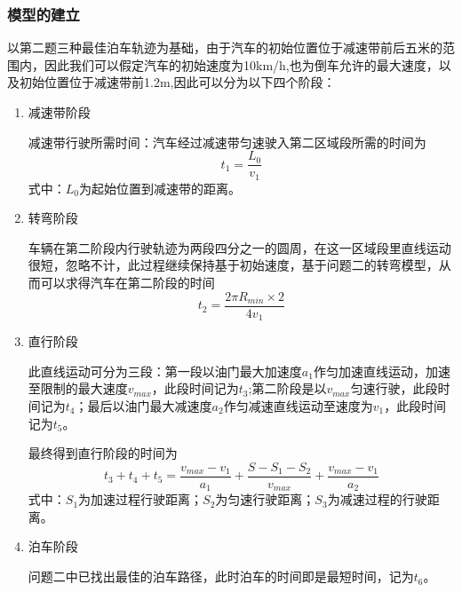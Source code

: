 \documentclass{MathorCupmodeling}
\begin{document}
	\subsubsection{模型的建立}
	以第二题三种最佳泊车轨迹为基础，由于汽车的初始位置位于减速带前后五米的范围内，因此我们可以假定汽车的初始速度为10km/h,也为倒车允许的最大速度，以及初始位置位于减速带前1.2m,因此可以分为以下四个阶段：
	\begin{enumerate}
		\item 减速带阶段
		
		减速带行驶所需时间：汽车经过减速带匀速驶入第二区域段所需的时间为
		\begin{equation}
			t_1=\frac{L_0}{v_1}
		\end{equation}
		式中：$L_0$为起始位置到减速带的距离。
		\item 转弯阶段
		
		车辆在第二阶段内行驶轨迹为两段四分之一的圆周，在这一区域段里直线运动很短，忽略不计，此过程继续保持基于初始速度，基于问题二的转弯模型，从而可以求得汽车在第二阶段的时间
		\begin{equation}
			t_2=\frac{2\pi R_{min}\times2}{{4v}_1}
		\end{equation}
		\item 直行阶段
		
		此直线运动可分为三段：第一段以油门最大加速度$a_1$作匀加速直线运动，加速至限制的最大速度$v_{max}$，此段时间记为$t_3$;第二阶段是以$v_{max}$匀速行驶，此段时间记为$t_4$；最后以油门最大减速度$a_2$作匀减速直线运动至速度为$v_1$，此段时间记为$t_5$。
		
		最终得到直行阶段的时间为
		\begin{equation}
			t_3+t_4+t_5=\frac{v_{max}-v_1}{a_1}+\frac{{S-S}_1-S_2}{v_{max}}+\frac{v_{max}-v_1}{a_2}
		\end{equation}
		式中：$S_1$为加速过程行驶距离；$S_2$为匀速行驶距离；$S_3$为减速过程的行驶距离。
		\item 泊车阶段
		
		问题二中已找出最佳的泊车路径，此时泊车的时间即是最短时间，记为$t_6$。
		

	\end{enumerate}
\end{document}
